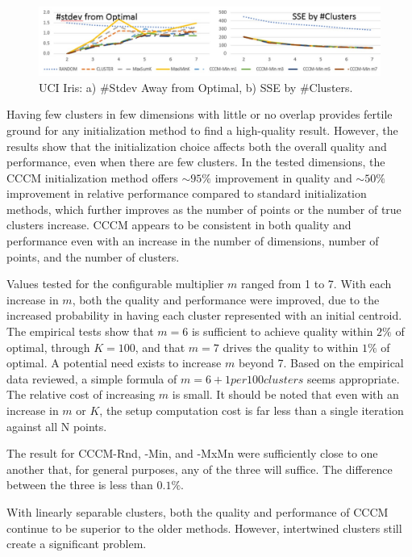 \documentclass{article}
\begin{document}
\begin{figure}
  \centering
  \includegraphics[width=\linewidth]{IrisStdev.jpg}
  \caption{UCI Iris: a) \#Stdev Away from Optimal, b) SSE by \#Clusters.}
  \label{fig:irisStdev}
\end{figure}

Having few clusters in few dimensions with little or no overlap provides fertile ground for any initialization method to find a high-quality result.  However, the results show that the initialization choice affects both the overall quality and performance, even when there are few clusters.  In the tested dimensions, the CCCM initialization method offers $\sim$$95\%$ improvement in quality and $\sim$$50\%$ improvement in relative performance compared to standard initialization methods, which further improves as the number of points or the number of true clusters increase.  CCCM appears to be consistent in both quality and performance even with an increase in the number of dimensions, number of points, and the number of clusters.

Values tested for the configurable multiplier $m$ ranged from 1 to 7.  With each increase in $m$, both the quality and performance were improved, due to the increased probability in having each cluster represented with an initial centroid.  The empirical tests show that $m=6$ is sufficient to achieve quality within $2\%$ of optimal, through $K=100$, and that $m=7$ drives the quality to within $1\%$ of optimal.  A potential need exists to increase $m$ beyond 7.  Based on the empirical data reviewed, a simple formula of $m=6 + 1 per 100 clusters$ seems appropriate.  The relative cost of increasing $m$ is small.  It should be noted that even with an increase in $m$ or $K$, the setup computation cost is far less than a single iteration against all N points.

The result for CCCM-Rnd, -Min, and -MxMn were sufficiently close to one another that, for general purposes, any of the three will suffice.  The difference between the three is less than $0.1\%$.

With linearly separable clusters, both the quality and performance of CCCM continue to be superior to the older methods.  However, intertwined clusters still create a significant problem.
\end{document}
